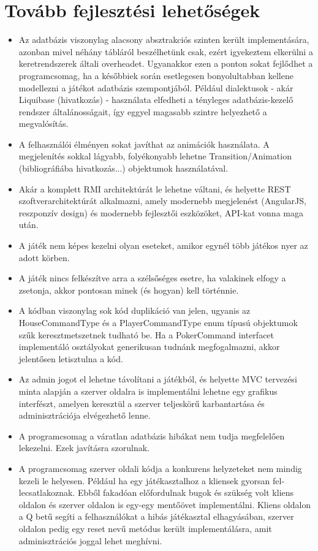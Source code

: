 \section{Tovább fejlesztési lehetőségek}
\begin{itemize}
\item Az adatbázis viszonylag alacsony absztrakciós szinten került implementására, azonban mivel néhány tábláról beszélhetünk csak, ezért igyekeztem elkerülni a keretrendszerek általi overheadet. Ugyanakkor ezen a ponton sokat fejlődhet a programcsomag, ha a későbbiek során esetlegesen bonyolultabban kellene modellezni a játékot adatbázis szempontjából. Például dialektusok - akár Liquibase (hivatkozás) - használata elfedheti a tényleges adatbázis-kezelő rendszer általánosságait, így eggyel magasabb szintre helyezhető a megvalósítás.
\item A felhasználói élményen sokat javíthat az animációk használata. A megjelenítés sokkal lágyabb, folyékonyabb lehetne Transition/Animation (bibliográfiába hivatkozás...) objektumok használatával.
\item Akár a komplett RMI architektúrát le lehetne váltani, és helyette REST szoftverarchitektúrát alkalmazni, amely modernebb megjelenést (AngularJS, reszponzív design) és modernebb fejlesztői eszközöket, API-kat vonna maga után.
\item A játék nem képes kezelni olyan eseteket, amikor egynél több játékos nyer az adott körben.
\item A játék nincs felkészítve arra a szélsőséges esetre, ha valakinek elfogy a zsetonja, akkor pontosan minek (és hogyan) kell történnie.
\item A kódban viszonylag sok kód duplikáció van jelen, ugyanis az HouseCommandType és a PlayerCommandType enum típusú objektumok szűk keresztmetszetnek tudható be. Ha a PokerCommand interfacet implementáló osztályokat generikusan tudnánk megfogalmazni, akkor jelentősen letisztulna a kód.
\item Az admin jogot el lehetne távolítani a játékból, és helyette MVC tervezési minta alapján a szerver oldalra is implementálni lehetne egy grafikus interfészt, amelyen keresztül a szerver teljeskörű karbantartása és adminisztrációja elvégezhető lenne.
\item A programcsomag a váratlan adatbázis hibákat nem tudja megfelelően lekezelni. Ezek javításra szorulnak.
\item A programcsomag szerver oldali kódja a konkurens helyzeteket nem mindig kezeli le helyesen. Például ha egy játékasztalhoz a kliensek gyorsan fel-lecsatlakoznak. Ebből fakadóan előfordulnak bugok és szükség volt kliens oldalon és szerver oldalon is egy-egy mentőövet implementálni. Kliens oldalon a Q betű segíti a felhasználókat a hibás játékasztal elhagyásában, szerver oldalon pedig egy reset nevű metódus került implementálásra, amit adminisztrációs joggal lehet meghívni.
\end{itemize}


\clearpage

